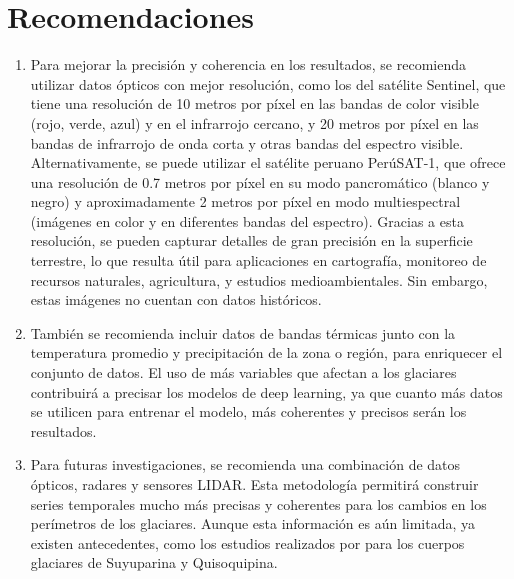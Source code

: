 \chapter*{Recomendaciones}
\doublespacing
\begin{enumerate}
	\item Para mejorar la precisión y coherencia en los resultados, se recomienda utilizar datos ópticos con mejor resolución, como los del satélite Sentinel, que tiene una resolución de 10 metros por píxel en las bandas de color visible (rojo, verde, azul) y en el infrarrojo cercano, y 20 metros por píxel en las bandas de infrarrojo de onda corta y otras bandas del espectro visible. Alternativamente, se puede utilizar el satélite peruano PerúSAT-1, que ofrece una resolución de 0.7 metros por píxel en su modo pancromático (blanco y negro) y aproximadamente 2 metros por píxel en modo multiespectral (imágenes en color y en diferentes bandas del espectro). Gracias a esta resolución, se pueden capturar detalles de gran precisión en la superficie terrestre, lo que resulta útil para aplicaciones en cartografía, monitoreo de recursos naturales, agricultura, y estudios medioambientales. Sin embargo, estas imágenes no cuentan con datos históricos.
	\item También se recomienda incluir datos de bandas térmicas junto con la temperatura promedio y precipitación de la zona o región, para enriquecer el conjunto de datos. El uso de más variables que afectan a los glaciares contribuirá a precisar los modelos de deep learning, ya que cuanto más datos se utilicen para entrenar el modelo, más coherentes y precisos serán los resultados.
	\item Para futuras investigaciones, se recomienda una combinación de datos ópticos, radares y sensores LIDAR. Esta metodología permitirá construir series temporales mucho más precisas y coherentes para los cambios en los perímetros de los glaciares. Aunque esta información es aún limitada, ya existen antecedentes, como los estudios realizados por \parencite{montoya2024estimation} para los cuerpos glaciares de Suyuparina y Quisoquipina.
\end{enumerate}
\singlespacing